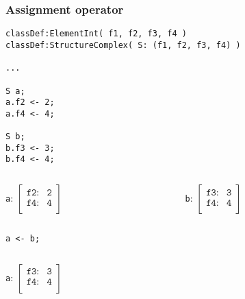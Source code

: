 \documentclass[11pt]{beamer}
\begin{document}
\begin{frame}[fragile]
\frametitle{Assignment operator}
\vspace{-20pt}
\scriptsize
\begin{lstlisting}[language=lekta]
classDef:ElementInt( f1, f2, f3, f4 )
classDef:StructureComplex( S: (f1, f2, f3, f4) )

...

S a;
a.f2 <- 2;
a.f4 <- 4;

S b;
b.f3 <- 3;
b.f4 <- 4;
\end{lstlisting}
\small
\vspace{-10pt}
\begin{columns}
	\begin{column}{0.5\textwidth}
		\begin{center}
			\texttt{a}: $\begin{bmatrix}
																				\texttt{f2:}      & \texttt{2}\\ 
																				\texttt{f4:}     	& \texttt{4}\\ 
																			\end{bmatrix}$
		\end{center}
	\end{column}
	\begin{column}{0.5\textwidth}
		\begin{center}
			\texttt{b}: $\begin{bmatrix}
																				\texttt{f3:}      & \texttt{3}\\ 
																				\texttt{f4:}     	& \texttt{4}\\ 
																			\end{bmatrix}$
		\end{center}
	\end{column}
\end{columns}
\begin{center}
\texttt{a <- b;}
\end{center}
\vspace{-30pt}
\begin{columns}
	\begin{column}{0.5\textwidth}
		\begin{center}
			\texttt{a}: $\begin{bmatrix}
																				\texttt{f3:}      & \texttt{3}\\ 
																				\texttt{f4:}     	& \texttt{4}\\ 
																			\end{bmatrix}$
		\end{center}

\end{column}
\end{columns}
\end{frame}
\end{document}
